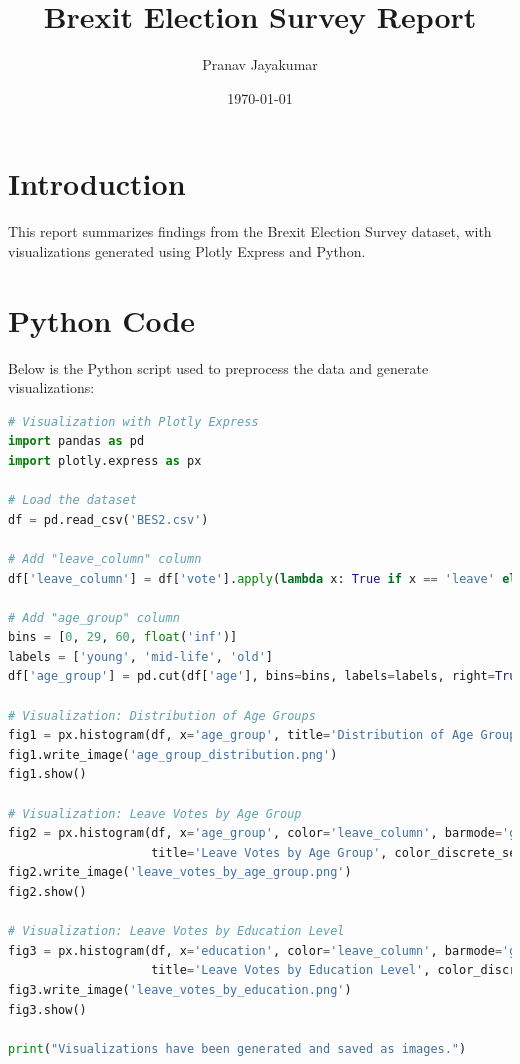 \documentclass{article}
\title{Brexit Election Survey Report}
\author{Pranav Jayakumar}
\date{\today}
\begin{document}
\maketitle

\section*{Introduction}
This report summarizes findings from the Brexit Election Survey dataset, with visualizations generated using Plotly Express and Python.

\section*{Python Code}
Below is the Python script used to preprocess the data and generate visualizations:

\begin{lstlisting}[language=Python, caption=Python Code for Data Analysis and Visualization]
# Visualization with Plotly Express
import pandas as pd
import plotly.express as px

# Load the dataset
df = pd.read_csv('BES2.csv')

# Add "leave_column" column
df['leave_column'] = df['vote'].apply(lambda x: True if x == 'leave' else (False if x == 'stay' else None))

# Add "age_group" column
bins = [0, 29, 60, float('inf')]
labels = ['young', 'mid-life', 'old']
df['age_group'] = pd.cut(df['age'], bins=bins, labels=labels, right=True)

# Visualization: Distribution of Age Groups
fig1 = px.histogram(df, x='age_group', title='Distribution of Age Groups', color_discrete_sequence=['#636EFA'])
fig1.write_image('age_group_distribution.png')
fig1.show()

# Visualization: Leave Votes by Age Group
fig2 = px.histogram(df, x='age_group', color='leave_column', barmode='group',
                    title='Leave Votes by Age Group', color_discrete_sequence=['#EF553B', '#00CC96'])
fig2.write_image('leave_votes_by_age_group.png')
fig2.show()

# Visualization: Leave Votes by Education Level
fig3 = px.histogram(df, x='education', color='leave_column', barmode='group',
                    title='Leave Votes by Education Level', color_discrete_sequence=['#EF553B', '#00CC96'])
fig3.write_image('leave_votes_by_education.png')
fig3.show()

print("Visualizations have been generated and saved as images.")
\end{lstlisting}
\end{document}
